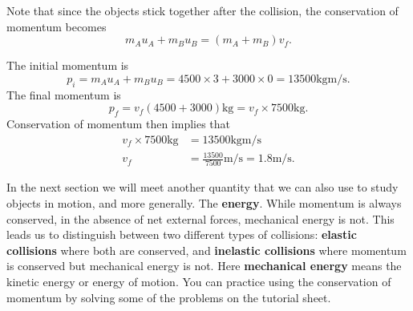 Note that since the objects stick together after the collision, the conservation of momentum becomes
\begin{equation*}
m_{A}u_{A}+m_{B}u_{B}=(m_{A}+m_{B})v_{f}.
\end{equation*}

The initial momentum is
\begin{equation*}
p_{i}=m_{A}u_{A}+m_{B}u_{B}=4500\times 3+3000\times 0=13500\text{kgm/s}.
\end{equation*}
The final momentum is
\begin{equation*}
p_{f}=v_{f}(4500+3000) \text{kg} =v_{f}\times 7500\text{kg}.
\end{equation*}
Conservation of momentum then implies that
\begin{align*}
v_{f}\times 7500\text{kg}&=13500\text{kgm/s}\\
v_{f}&=\frac{13500}{7500}\text{m/s}=1.8\text{m/s}.
\end{align*}

In the next section we will meet another quantity that we can also use to study objects in motion, and more generally. The \textbf{energy}.  While momentum is always conserved, in the absence of net external forces, mechanical energy is not. This leads us to distinguish between two different types of collisions: \textbf{elastic collisions} where both are conserved, and \textbf{inelastic collisions} where momentum is conserved but mechanical energy is not. Here \textbf{mechanical energy} means the kinetic energy or energy of motion. You can practice using the conservation of momentum by solving some of the problems on the tutorial sheet.
